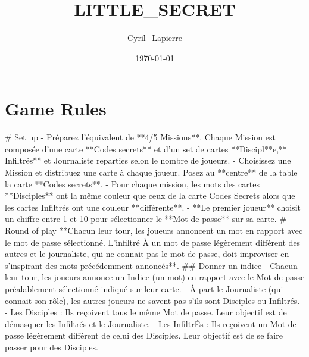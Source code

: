 \documentclass{article}%
\title{LITTLE\_SECRET}%
\author{Cyril\_Lapierre}%
\date{\today}%
\begin{document}
%
\pagestyle{empty}%
\normalsize%
\maketitle%
\section{Game Rules}%
\label{sec:GameRules}%
\# Set up
\newline%
{-} Préparez l'équivalent de **4/5 Missions**. Chaque Mission est composée d'une carte **Codes secrets** et d'un set de cartes **Discipl**e,** Infiltrés** et Journaliste reparties selon le nombre de joueurs.
\newline%
{-} Choisissez une Mission et distribuez une carte à chaque joueur. Posez au **centre** de la table la carte **Codes secrets**.
\newline%
{-} Pour chaque mission, les mots des cartes **Disciples** ont la même couleur que ceux de la carte Codes Secrets alors que les cartes Infiltrés ont une couleur **différente**.
\newline%
{-} **Le premier joueur** choisit un chiffre entre 1 et 10 pour sélectionner le **Mot de passe** sur sa carte.
\newline%
 \# Round of play
\newline%
 **Chacun leur tour, les joueurs annoncent un mot en rapport avec le mot de passe sélectionné. L'infiltré À un mot de passe légèrement différent des autres et le journaliste, qui ne connait pas le mot de passe, doit improviser en s'inspirant des mots précédemment annoncés**.
\newline%
 \#\# Donner un indice
\newline%
{-} Chacun leur tour, les joueurs annonce un Indice (un mot) en rapport avec le Mot de passe préalablement sélectionné
\newline%
indiqué sur leur carte.
\newline%
{-} À part le Journaliste (qui connait son rôle), les autres joueurs ne savent pas s'ils sont Disciples ou Infiltrés.
\newline%
{-} Les Disciples : Ils reçoivent tous le même Mot de passe. Leur objectif est de démasquer les Infiltrés et le
\newline%
Journaliste.
\newline%
{-} Les InfiltrÉs : Ils reçoivent un Mot de passe légèrement différent de celui des Disciples. Leur objectif est
\newline%
de se faire passer pour des Disciples.
\end{document}
